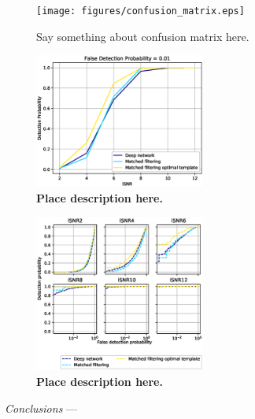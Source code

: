 \documentclass[%
 amsmath,amssymb,
 aps,
 twocolumn,
floatfix,
]{revtex4-1}
\begin{document}
\begin{figure}[!h]
 \centering
  \texttt{[image: figures/confusion\_matrix.eps]}
 \caption{\label{fig:confusion} Say something about confusion matrix here.}
\end{figure}

\begin{figure}[!h]
 \includegraphics[width=0.5\textwidth]
 {figures/accuracy.eps}
 \caption{\label{fig:accuracy} \textbf{Place description here.}}
\end{figure}

\begin{figure}[!h]
 \includegraphics[width=0.5\textwidth]
 {figures/ROC_curves.eps}
 \caption{\label{fig:ROC_curve} \textbf{Place description here.}}
\end{figure}

\textit{Conclusions} --- 



\nocite{*}

\end{document}
